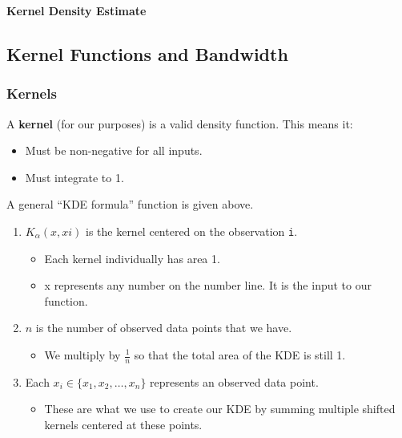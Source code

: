 \documentclass[
  letterpaper,
  DIV=11,
  numbers=noendperiod]{scrreprt}
\providecommand{\tightlist}{%
  \setlength{\itemsep}{0pt}\setlength{\parskip}{0pt}}\usepackage{longtable,booktabs,array}
\begin{document}
\textbf{Kernel Density Estimate}

\hypertarget{kernel-functions-and-bandwidth}{%
\subsection{Kernel Functions and
Bandwidth}\label{kernel-functions-and-bandwidth}}

\hypertarget{kernels}{%
\subsubsection{Kernels}\label{kernels}}

A \textbf{kernel} (for our purposes) is a valid density function. This
means it:

\begin{itemize}
\tightlist
\item
  Must be non-negative for all inputs.
\item
  Must integrate to 1.
\end{itemize}

A general ``KDE formula'' function is given above.

\begin{enumerate}
\def\labelenumi{\arabic{enumi}.}
\tightlist
\item
  \(K_{\alpha}(x, xi)\) is the kernel centered on the observation
  \texttt{i}.

  \begin{itemize}
  \tightlist
  \item
    Each kernel individually has area 1.
  \item
    x represents any number on the number line. It is the input to our
    function.
  \end{itemize}
\item
  \(n\) is the number of observed data points that we have.

  \begin{itemize}
  \tightlist
  \item
    We multiply by \(\frac{1}{n}\) so that the total area of the KDE is
    still 1.
  \end{itemize}
\item
  Each \(x_i \in \{x_1, x_2, \dots, x_n\}\) represents an observed data
  point.

  \begin{itemize}
  \tightlist
  \item
    These are what we use to create our KDE by summing multiple shifted
    kernels centered at these points.
  \end{itemize}
\end{enumerate}
\end{document}
